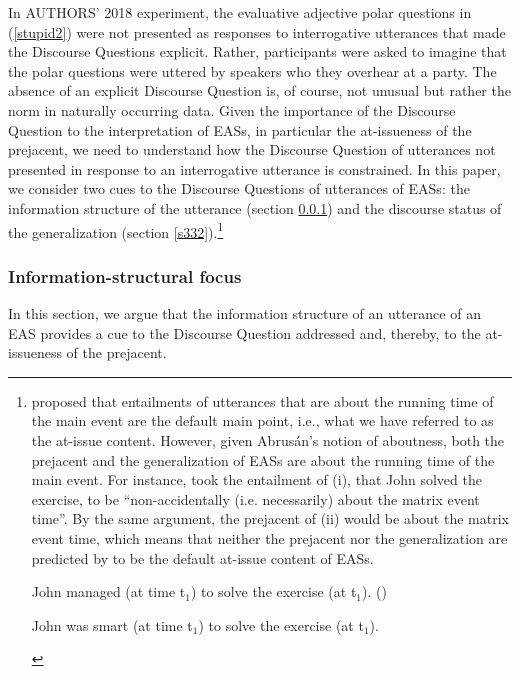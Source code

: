 \documentclass[11pt,fleqn]{article}
\newcommand{\6}{\mbox{$[\hspace*{-.6mm}[$}}
\newcommand{\9}{\mbox{$]\hspace*{-.6mm}]$}}
\begin{document}
In AUTHORS' 2018 experiment, the evaluative adjective polar questions in (\ref{stupid2}) were not presented as responses to interrogative utterances that made the Discourse Questions explicit. Rather, participants were asked to imagine that the polar questions were uttered by speakers who they overhear at a party. The absence of an explicit Discourse Question is, of course, not unusual but rather the norm in naturally occurring data. Given the importance of the Discourse Question to the interpretation of EASs, in particular the at-issueness of the prejacent, we need to understand how the Discourse Question of utterances not presented in response to an interrogative utterance is constrained. In this paper, we consider two cues to the Discourse Questions of utterances of EASs: the information structure of the utterance (section \ref{s331}) and the discourse status of the generalization (section \ref{s332}).\footnote{\citet{abrusan2011} proposed that entailments of utterances that are about the running time of the main event are the default main point, i.e., what we have referred to as the at-issue content. However, given Abrus\'an's notion of aboutness, both the prejacent and the generalization of EASs are about the running time of the main event. For instance, \citet[508]{abrusan2011} took the entailment of (i), that John solved the exercise, to be ``non-accidentally (i.e. necessarily) about the matrix event time''. By the same argument, the prejacent of (ii) would be about the matrix event time, which means that neither the prejacent nor the generalization are predicted by \citealt{abrusan2011} to be the default at-issue content of EASs.



\begin{exe}
 John managed (at time t$_{\mbox{1}}$) to solve the exercise (at t$_{\mbox{1}}$). \hfill (\citealt[508]{abrusan2011})

 John was smart (at time t$_{\mbox{1}}$) to solve the exercise (at t$_{\mbox{1}}$).

\end{exe}}


\subsubsection{Information-structural focus}\label{s331}

In this section, we argue that the information structure of an utterance of an EAS provides a cue to the Discourse Question addressed and, thereby, to the at-issueness of the prejacent. 
\end{document}
